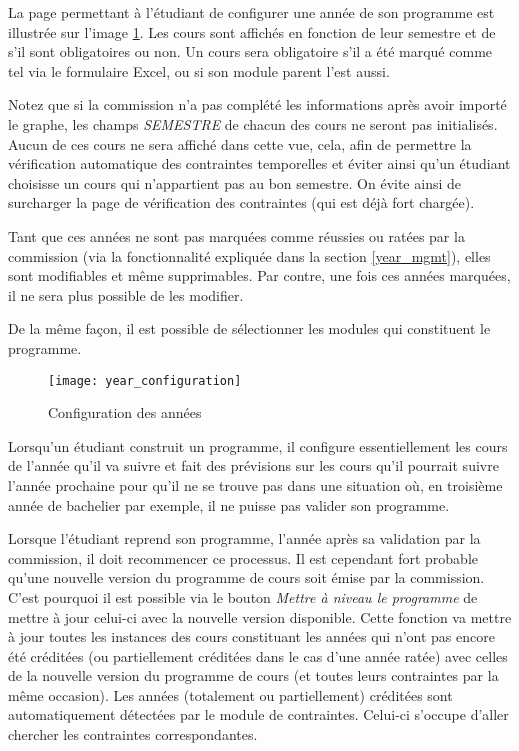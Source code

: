 La page permettant à l'étudiant de configurer une année de son programme est illustrée sur l'image \ref{fig:year_configuration}. Les cours sont affichés en fonction de leur semestre et de s'il sont obligatoires ou non. Un cours sera obligatoire s'il a été marqué comme tel via le formulaire Excel, ou si son module parent l'est aussi.

Notez que si la commission n'a pas complété les informations après avoir importé le graphe, les champs \textit{SEMESTRE} de chacun des cours ne seront pas initialisés. Aucun de ces cours ne sera affiché dans cette vue, cela, afin de permettre la vérification automatique des contraintes temporelles et éviter ainsi qu'un étudiant choisisse un cours qui n'appartient pas au bon semestre. On évite ainsi de surcharger la page de vérification des contraintes (qui est déjà fort chargée).

Tant que ces années ne sont pas marquées comme réussies ou ratées par la commission (via la fonctionnalité expliquée dans la section \ref{year_mgmt}), elles sont modifiables et même supprimables. Par contre, une fois ces années marquées, il ne sera plus possible de les modifier. 

De la même façon, il est possible de sélectionner les modules qui constituent le programme.
\begin{figure}
\centering
\caption{Configuration des années}
\label{fig:year_configuration}
\texttt{[image: year\_configuration]}
\end{figure}

Lorsqu'un étudiant construit un programme, il configure essentiellement les cours de l'année qu'il va suivre et fait des prévisions sur les cours qu'il pourrait suivre l'année prochaine pour qu'il ne se trouve pas dans une situation où, en troisième année de bachelier par exemple, il ne puisse pas valider son programme.

Lorsque l'étudiant reprend son programme, l'année après sa validation par la commission, il doit recommencer ce processus. Il est cependant fort probable qu'une nouvelle version du programme de cours soit émise par la commission. C'est pourquoi il est possible via le bouton \textit{Mettre à niveau le programme} de mettre à jour celui-ci avec la nouvelle version disponible. Cette fonction va mettre à jour toutes les instances des cours constituant les années qui n'ont pas encore été créditées (ou partiellement créditées dans le cas d'une année ratée) avec celles de la nouvelle version du programme de cours (et toutes leurs contraintes par la même occasion). Les années (totalement ou partiellement) créditées sont automatiquement détectées par le module de contraintes. Celui-ci s'occupe d'aller chercher les contraintes correspondantes. 

